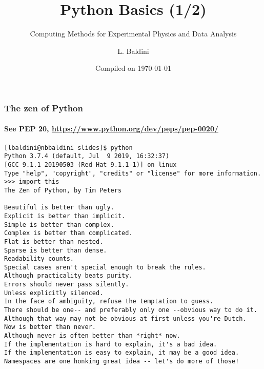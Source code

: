 \documentclass[9pt]{beamer}
\title{Python Basics (1/2)}
\subtitle{Computing Methods for Experimental Physics and Data Analysis}
\date{Compiled on \today}
\author{L. Baldini}
\institute[UNIPI and INFN]{Universit\`a and INFN--Pisa}
\begin{document}
\titleframe


\begin{frame}[fragile]
  \frametitle{The zen of Python}
  \framesubtitle{See PEP 20, \url{https://www.python.org/dev/peps/pep-0020/}}
  \begin{Verbatim}
[lbaldini@nbbaldini slides]$ python
Python 3.7.4 (default, Jul  9 2019, 16:32:37)
[GCC 9.1.1 20190503 (Red Hat 9.1.1-1)] on linux
Type "help", "copyright", "credits" or "license" for more information.
>>> import this
The Zen of Python, by Tim Peters

Beautiful is better than ugly.
Explicit is better than implicit.
Simple is better than complex.
Complex is better than complicated.
Flat is better than nested.
Sparse is better than dense.
Readability counts.
Special cases aren't special enough to break the rules.
Although practicality beats purity.
Errors should never pass silently.
Unless explicitly silenced.
In the face of ambiguity, refuse the temptation to guess.
There should be one-- and preferably only one --obvious way to do it.
Although that way may not be obvious at first unless you're Dutch.
Now is better than never.
Although never is often better than *right* now.
If the implementation is hard to explain, it's a bad idea.
If the implementation is easy to explain, it may be a good idea.
Namespaces are one honking great idea -- let's do more of those!
  \end{Verbatim}
\end{frame}
\end{document}

